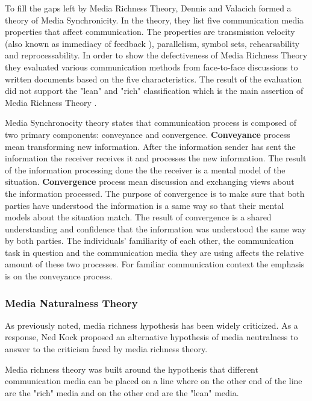 \documentclass[english,12pt,a4paper,pdftex]{article}
\begin{document}
To fill the gaps left by Media Richness Theory, Dennis and Valacich formed a theory of Media Synchronicity. In the theory, they list five communication media properties that affect communication. The properties are transmission velocity (also known as immediacy of feedback \citep{dennis1999}), parallelism, symbol sets, rehearsability and reprocessability. In order to show the defectiveness of Media Richness Theory they evaluated various communication methods from face-to-face discussions to written documents based on the five characteristics. The result of the evaluation did not support the "lean" and "rich" classification which is the main assertion of Media Richness Theory \citep{dennis2008}.

Media Synchronocity theory states that communication process is composed of two primary components: conveyance and convergence. \textbf{Conveyance} process mean transforming new information. After the information sender has sent the information the receiver receives it and processes the new information. The result of the information processing done the the receiver is a mental model of the situation. \textbf{Convergence} process mean discussion and exchanging views about the information processed. The purpose of convergence is to make sure that both parties have understood the information is a same way so that their mental models about the situation match. The result of convergence is a shared understanding and confidence that the information was understood the same way by both parties. The individuals' familiarity of each other, the communication task in question and the communication media they are using affects the relative amount of these two processes. For familiar communication context the emphasis is on the conveyance process. \citep{dennis2008}

\subsubsection{Media Naturalness Theory}

As previously noted, media richness hypothesis has been widely criticized. As a response, Ned Kock proposed an alternative hypothesis of media neutralness to answer to the criticism faced by media richness theory.

Media richness theory was built around the hypothesis that different communication media can be placed on a line where on the other end of the line are the "rich" media and on the other end are the "lean" media. \citep{daft1986}
\end{document}

